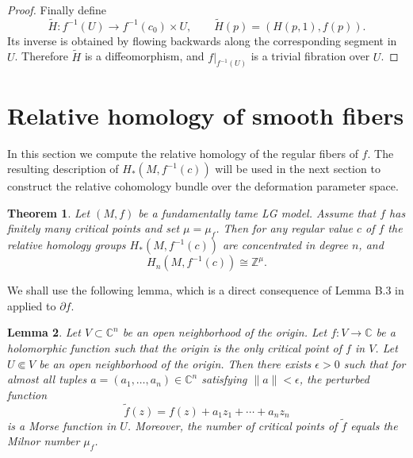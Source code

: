 \documentclass[11pt]{amsart}
\theoremstyle{plain}
\newtheorem{theorem}{Theorem}[section]
\newtheorem{lemma}[theorem]{Lemma}
\theoremstyle{definition}
\theoremstyle{remark}
\numberwithin{equation}{section}
\begin{document}
\begin{proof}
    Finally define
    \begin{equation}
        \tilde{H} : f^{-1}(U) \to f^{-1}(c_0) \times U, \qquad \tilde{H}(p) = (H(p,1), f(p)).
    \end{equation}
    Its inverse is obtained by flowing backwards along the corresponding segment in $U$.
    Therefore $\tilde{H}$ is a diffeomorphism, and $f|_{f^{-1}(U)}$ is a trivial fibration over $U$.
\end{proof}

\section{Relative homology of smooth fibers}\label{sec:relative}

In this section we compute the relative homology of the regular fibers of $f$.
The resulting description of $H_*(M, f^{-1}(c))$ will be used in the next section to construct the relative cohomology bundle over the deformation parameter space.

\begin{theorem}\label{thm:main}
    Let $(M,f)$ be a fundamentally tame LG model.
    Assume that $f$ has finitely many critical points and set $\mu = \mu_f$.
    Then for any regular value $c$ of $f$ the relative homology groups $H_*(M, f^{-1}(c))$ are concentrated in degree $n$, and
    \begin{equation}
        H_n(M, f^{-1}(c)) \cong \mathbb{Z}^{\mu}.
    \end{equation}
\end{theorem}

We shall use the following lemma, which is a direct consequence of Lemma B.3 in \cite{milnor1968singular} applied to $\partial f$.

\begin{lemma}\label{lem:perturbation}
    Let $V \subset \mathbb{C}^n$ be an open neighborhood of the origin.
    Let $f : V \to \mathbb{C}$ be a holomorphic function such that the origin is the only critical point of $f$ in $V$.
    Let $U \Subset V$ be an open neighborhood of the origin.
    Then there exists $\epsilon > 0$ such that for almost all tuples $a = (a_1, \ldots, a_n) \in \mathbb{C}^n$ satisfying $\|a\| < \epsilon$, the perturbed function
    \begin{equation}
        \tilde{f}(z) = f(z) + a_1 z_1 + \cdots + a_n z_n
    \end{equation}
    is a Morse function in $U$.
    Moreover, the number of critical points of $\tilde{f}$ equals the Milnor number $\mu_f$.
\end{lemma}
\end{document}
